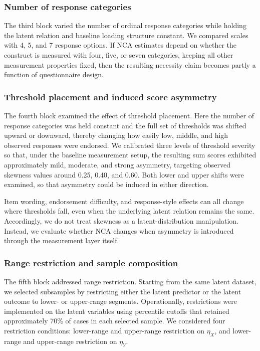 \documentclass[
  man,
  longtable,
  nolmodern,
  notxfonts,
  notimes,
  colorlinks=true,linkcolor=blue,citecolor=blue,urlcolor=blue]{apa7}
\begin{document}
\subsubsection{Number of response
categories}\label{number-of-response-categories}

The third block varied the number of ordinal response categories while
holding the latent relation and baseline loading structure constant. We
compared scales with 4, 5, and 7 response options. If NCA estimates
depend on whether the construct is measured with four, five, or seven
categories, keeping all other measurement properties fixed, then the
resulting necessity claim becomes partly a function of questionnaire
design.

\subsubsection{Threshold placement and induced score
asymmetry}\label{threshold-placement-and-induced-score-asymmetry}

The fourth block examined the effect of threshold placement. Here the
number of response categories was held constant and the full set of
thresholds was shifted upward or downward, thereby changing how easily
low, middle, and high observed responses were endorsed. We calibrated
three levels of threshold severity so that, under the baseline
measurement setup, the resulting sum scores exhibited approximately
mild, moderate, and strong asymmetry, targeting observed skewness values
around 0.25, 0.40, and 0.60. Both lower and upper shifts were examined,
so that asymmetry could be induced in either direction.

Item wording, endorsement difficulty, and response-style effects can all
change where thresholds fall, even when the underlying latent relation
remains the same. Accordingly, we do not treat skewness as a
latent-distribution manipulation. Instead, we evaluate whether NCA
changes when asymmetry is introduced through the measurement layer
itself.

\subsubsection{Range restriction and sample
composition}\label{range-restriction-and-sample-composition}

The fifth block addressed range restriction. Starting from the same
latent dataset, we selected subsamples by restricting either the latent
predictor or the latent outcome to lower- or upper-range segments.
Operationally, restrictions were implemented on the latent variables
using percentile cutoffs that retained approximately 70\% of cases in
each selected sample. We considered four restriction conditions:
lower-range and upper-range restriction on \(\eta_X\), and lower-range
and upper-range restriction on \(\eta_Y\).
\end{document}
